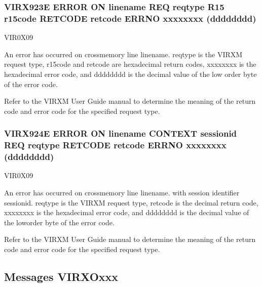 \documentclass[letterpaper,10pt,english]{sphinxmanual}
\begin{document}
\subsubsection{VIRX923E ERROR ON linename REQ reqtype R15 r15code RETCODE retcode ERRNO xxxxxxxx (dddddddd)}
\label{\detokenize{messages:virx923e-error-on-linename-req-reqtype-r15-r15code-retcode-retcode-errno-xxxxxxxx-dddddddd}}\begin{description}
\sphinxAtStartPar
VIR0X09

\sphinxAtStartPar
An error has occurred on cross\sphinxhyphen{}memory line linename. reqtype is the VIRXM request type, r15code and retcode are hexadecimal return codes, xxxxxxxx is the hexadecimal error code, and dddddddd is the decimal value of the low\sphinxhyphen{} order byte of the error code.

\sphinxAtStartPar
Refer to the VIRXM User Guide manual to determine the meaning of the return code and error code for the specified request type.

\end{description}


\subsubsection{VIRX924E ERROR ON linename CONTEXT sessionid REQ reqtype RETCODE retcode ERRNO xxxxxxxx (dddddddd)}
\label{\detokenize{messages:virx924e-error-on-linename-context-sessionid-req-reqtype-retcode-retcode-errno-xxxxxxxx-dddddddd}}\begin{description}
\sphinxAtStartPar
VIR0X09

\sphinxAtStartPar
An error has occurred on cross\sphinxhyphen{}memory line linename. with session identifier sessionid. reqtype is the VIRXM request type, retcode is the decimal return code, xxxxxxxx is the hexadecimal error code, and dddddddd is the decimal value of the low\sphinxhyphen{}order byte of the error code.

\sphinxAtStartPar
Refer to the VIRXM User Guide manual to determine the meaning of the return code and error code for the specified request type.

\end{description}


\subsection{Messages VIRXOxxx}
\label{\detokenize{messages:messages-virxoxxx}}
\end{document}

